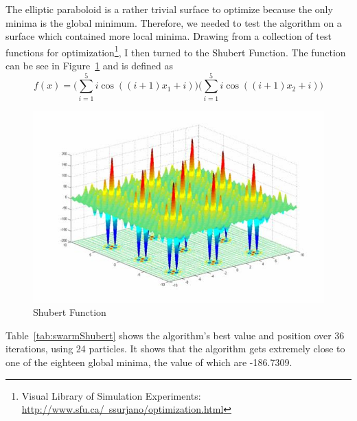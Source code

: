 \documentclass[oneside,12pt,openany]{book}
\begin{document}
    \FloatBarrier
    
    The elliptic paraboloid is a rather trivial surface to optimize because the only minima is the global minimum. Therefore, we needed to test the algorithm on a surface which contained more local minima. Drawing from a collection of test functions for optimization\footnote{Visual Library of Simulation Experiments: \href{http://www.sfu.ca/~ssurjano/optimization.html}{http://www.sfu.ca/~ssurjano/optimization.html}}, I then turned to the Shubert Function. The function can be see in Figure~\ref{fig:Shubert} and is defined as $$f(x)=\Bigg(\sum_{i=1}^{5} i\cos((i+1)x_{1}+i)\Bigg)\Bigg(\sum_{i=1}^{5} i\cos((i+1)x_{2}+i)\Bigg)$$
    
     \begin{figure}[hbt!]
        \centering
        \includegraphics[width=.8\linewidth]{images/Shubert.jpg}
        \caption{Shubert Function}
        \label{fig:Shubert}
    \end{figure}

    Table~\ref{tab:swarmShubert} shows the algorithm's best value and position over 36 iterations, using 24 particles. It shows that the algorithm gets extremely close to one of the eighteen global minima, the value of which are -186.7309.
    
    \FloatBarrier
\end{document}
